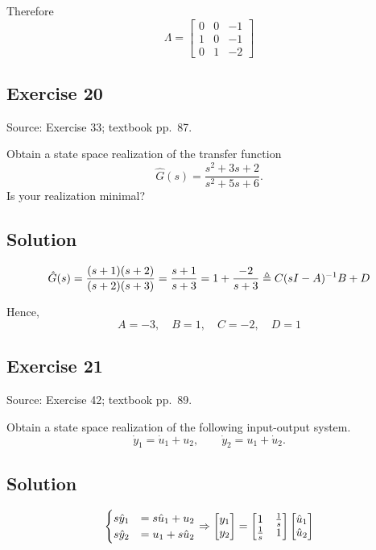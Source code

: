 \documentclass[12pt,a4paper]{article}
\newlength{\questionroom}
\newenvironment{questionprompt}{%
  \begin{lrbox}{\questionbox}\begin{minipage}{\linewidth}%
}{%
  \end{minipage}\end{lrbox}%
  \setlength{\questionroom}{\dimexpr\ht\questionbox+\dp\questionbox+5.2cm\relax}%
  \ifdim\questionroom>\textheight\setlength{\questionroom}{\textheight}\fi
  \Needspace{\questionroom}%
  \noindent\usebox{\questionbox}\par
}
\begin{document}
Therefore
\[
\Lambda = \begin{bmatrix}
	0 & 0 & -1 \\
	1 & 0 & -1 \\
	0 & 1 & -2
\end{bmatrix}
\]




\vspace{3.5cm}


\begin{questionprompt}
\section*{Exercise 20}
\label{practice:20}
{\small Source: Exercise 33; textbook pp.~87.}\par
Obtain a state space realization of the transfer function
\[\widehat G(s)=\frac{s^2+3s+2}{s^2+5s+6}.\]
Is your realization minimal?
\end{questionprompt}
\subsection*{Solution}

\[
\hat G(s) = {(s + 1)(s + 2) \over (s + 2)( s + 3)} = {s + 1 \over s + 3} = 1  + {-2 \over s + 3} \triangleq C(sI - A)^{-1}B + D
\]

Hence, 
\[
A = -3, \quad B = 1, \quad C = -2, \quad D = 1
\]

\vspace{3.5cm}


\begin{questionprompt}
\section*{Exercise 21}
\label{practice:21}
{\small Source: Exercise 42; textbook pp.~89.}\par
Obtain a state space realization of the following input-output system.
\[\dot y_1=\dot u_1+u_2,\qquad\dot y_2=u_1+\dot u_2.\]
\end{questionprompt}
\subsection*{Solution}

\[
\begin{cases}
	s\hat y_1 &= s\hat u_1 + u_2 \\
	s\hat y_2 &= u_1 + s\hat u_2
\end{cases} \Rightarrow \begin{bmatrix}
y_1 \\ y_2
\end{bmatrix} = \begin{bmatrix}
1 & {1\over s} \\
{1\over s} & 1
\end{bmatrix} \begin{bmatrix}
\hat u_1 \\ \hat u_2
\end{bmatrix}
\]
\end{document}
